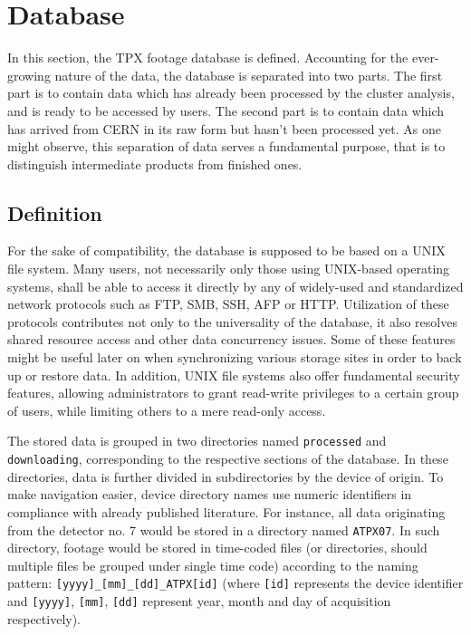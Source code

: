 \section{Database}
\label{db:definition}
In this section, the TPX footage database is defined. Accounting for the ever-growing nature of the data, the database is separated into two parts. The first part is to contain data which has already been processed by the cluster analysis, and is ready to be accessed by users. The second part is to contain data which has arrived from CERN in its raw form but hasn't been processed yet. As one might observe, this separation of data serves a fundamental purpose, that is to distinguish intermediate products from finished ones.


\subsection{Definition}
For the sake of compatibility, the database is supposed to be based on a UNIX file system. Many users, not necessarily only those using UNIX-based operating systems, shall be able to access it directly by any of widely-used and standardized network protocols such as FTP, SMB, SSH, AFP or HTTP\label{db:supported-protocols}. Utilization of these protocols contributes not only to the universality of the database, it also resolves shared resource access and other data concurrency issues. Some of these features might be useful later on when synchronizing various storage sites in order to back up or restore data. In addition, UNIX file systems also offer fundamental security features, allowing administrators to grant read-write privileges to a certain group of users, while limiting others to a mere read-only access.

The stored data is grouped in two directories named \texttt{processed} and \texttt{downloading}, corresponding to the respective sections of the database. In these directories, data is further divided in subdirectories by the device of origin. To make navigation easier, device directory names use numeric identifiers in compliance with already published literature. For instance, all data originating from the detector no. 7 would be stored in a directory named \texttt{ATPX07}. In such directory, footage would be stored in time-coded files (or directories, should multiple files be grouped under single time code) according to the naming pattern: \texttt{[yyyy]\_[mm]\_[dd]\_ATPX[id]} (where \texttt{[id]} represents the device identifier and \texttt{[yyyy]}, \texttt{[mm]}, \texttt{[dd]} represent year, month and day of acquisition respectively).


